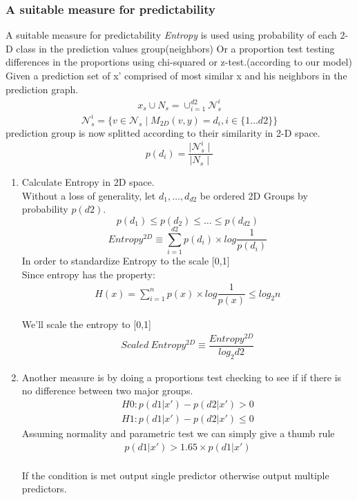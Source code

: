 \documentclass[a4paper]{article}
\begin{document}
\subsubsection{A suitable measure for predictability}
A suitable measure for predictability \emph{Entropy} is used	
using probability of each 2-D class in the prediction values group(neighbors)	
Or a proportion test testing differences in the proportions using chi-squared
or z-test.(according to our model)
Given a prediction set of x' comprised of most similar x and his  neighbors in the prediction graph.
\begin{align*}
 x_s \cup N_s = \cup_{i=1}^{d2} \mathcal{N}_s^i
\end{align*}
 \begin{equation}
\mathcal{N}_{s}^{i} = \{ v \in \mathcal{N}_s \mid M_{2D}(v,y) =d_i  , i \in \{1\dots d2 \}\}
 \end{equation}
prediction group is now splitted according to their similarity in 2-D space.
  \begin{equation}
  p(d_i)=\dfrac{\mid \mathcal{N}_{s}^{i}\mid }{ \mid  N_s\mid }
  \end{equation}


\begin{enumerate}
 \item Calculate Entropy in 2D space.\\
   Without a loss of generality, let  $d_1, \dots ,d_{d2}$
   be ordered 2D Groups by probability $p(d2)$.
  \begin{equation}
 p(d_1)\leq p(d_2)\leq \dots \leq p(d_{d2})
  \end{equation}
  \begin{equation}
  Entropy^{2D} \equiv  \sum\limits_{i=1}^{d2} p(d_i) \times  log\dfrac{1}{p(d_i)}
  \end{equation}
  In order to standardize Entropy to the scale [0,1]\\
  Since entropy has the property:
    \begin{align*}
     H(x)= \sum\limits_{i=1}^{n} p(x) \times log\dfrac{1}{p(x)} \leq log_{2}n 
    \end{align*}
   
   We'll scale the entropy to [0,1]
  \begin{align*}
   Scaled\ Entropy^{2D} \equiv  \dfrac{Entropy^{2D}}{log_{2}d2}
  \end{align*}
  \item
  Another measure is by doing a proportions test
  checking to see if if there is no difference between two major groups.
  \begin{align*}
  H0: p(d1|x') -  p(d2|x') >0\\
  H1:p(d1|x') -  p(d2|x') \leq 0
  \end{align*}
  Assuming normality and parametric test we can
  simply give a thumb rule 
  \begin{align*} 
  p(d1|x') > 1.65 \times p(d1|x')\\
   \end{align*} 
   
   If the condition is met output single predictor
   otherwise output multiple  predictors.
\end{enumerate}
\end{document}
